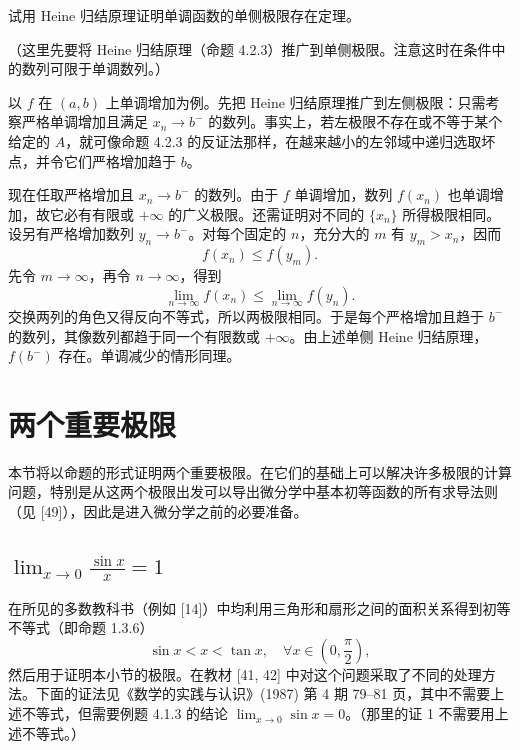 \begin{xexercise}[11]
试用 Heine 归结原理证明单调函数的单侧极限存在定理。

  （这里先要将 Heine 归结原理（命题 4.2.3）推广到单侧极限。注意这时在条件中的数列可限于单调数列。）
\end{xexercise}
\begin{xsolution}
以 $f$ 在 $(a,b)$ 上单调增加为例。先把 Heine 归结原理推广到左侧极限：只需考察严格单调增加且满足 $x_n\to b^-$ 的数列。事实上，若左极限不存在或不等于某个给定的 $A$，就可像命题 4.2.3 的反证法那样，在越来越小的左邻域中递归选取坏点，并令它们严格增加趋于 $b$。

现在任取严格增加且 $x_n\to b^-$ 的数列。由于 $f$ 单调增加，数列 $f(x_n)$ 也单调增加，故它必有有限或 $+\infty$ 的广义极限。还需证明对不同的 $\{x_n\}$ 所得极限相同。设另有严格增加数列 $y_n\to b^-$。对每个固定的 $n$，充分大的 $m$ 有 $y_m>x_n$，因而
\[
  f(x_n)\leq f(y_m).
\]
先令 $m\to\infty$，再令 $n\to\infty$，得到
\[
  \lim_{n\to\infty}f(x_n)\leq\lim_{n\to\infty}f(y_n).
\]
交换两列的角色又得反向不等式，所以两极限相同。于是每个严格增加且趋于 $b^-$ 的数列，其像数列都趋于同一个有限数或 $+\infty$。由上述单侧 Heine 归结原理，$f(b^-)$ 存在。单调减少的情形同理。
\end{xsolution}


\section{两个重要极限}

本节将以命题的形式证明两个重要极限。在它们的基础上可以解决许多极限的计算问题，特别是从这两个极限出发可以导出微分学中基本初等函数的所有求导法则（见 [49]），因此是进入微分学之前的必要准备。

\subsection{\texorpdfstring{$\displaystyle\lim_{x\to0}\frac{\sin x}{x}=1$}{极限 sin(x)/x = 1}}

在所见的多数教科书（例如 [14]）中均利用三角形和扇形之间的面积关系得到初等不等式（即命题 1.3.6）
\[
  \sin x<x<\tan x,\quad \forall x\in\left(0,\frac\pi2\right),
\]
然后用于证明本小节的极限。在教材 [41, 42] 中对这个问题采取了不同的处理方法。下面的证法见《数学的实践与认识》(1987) 第 4 期 79--81 页，其中不需要上述不等式，但需要例题 4.1.3 的结论 $\lim_{x\to0}\sin x=0$。（那里的证 1 不需要用上述不等式。）

